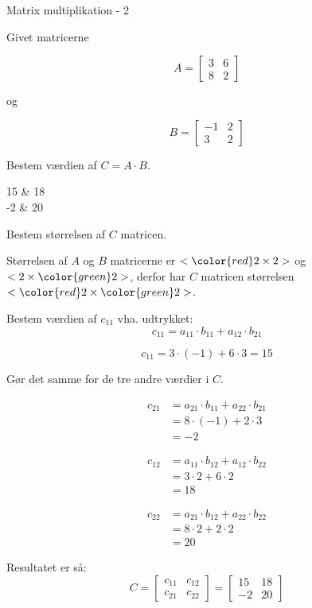 \documentclass{article}
\begin{document}
\newpage

\begin{exercise}{Matrix multiplikation - 2}
	
	Givet matricerne 
	
	\[
	A = \left[\begin{array}{rr}
	3 & 6 \\ 
	8 & 2 
	\end{array} \right]
	\]
	
	og 
	
	\[
	B = \left[\begin{array}{rr}
	-1 & 2 \\ 
	3 & 2 
	\end{array} \right]
	\]
	
	Bestem værdien af $C = A \cdot B$.
	
	\begin{answermatrix}
		15 & 18  \\
		-2 & 20 
	\end{answermatrix}
	
	\hint
	Bestem størrelsen af $C$ matricen.
	
	\hint
	Størrelsen af $A$ og $B$ matricerne er $<{\color{red} 2} \times 2>$ og $<2 \times {\color{green}2}>$, 
	derfor har $C$ matricen størrelsen $<{\color{red} 2} \times {\color{green}2}>$.
	
	\hint
	Bestem værdien af $c_{11}$ vha. udtrykket:
	\[
	c_{11} = a_{11} \cdot b_{11} + a_{12} \cdot b_{21}
	\]
	
	\hint
	\[
	c_{11} = 3 \cdot (-1) + 6 \cdot 3 = 15
	\]
	
	\hint
	Gør det samme for de tre andre værdier i $C$.
	
	\hint
	\begin{align*}
		c_{21} & = a_{21} \cdot b_{11} + a_{22} \cdot b_{21} \\
		& = 8 \cdot (-1) + 2 \cdot 3 \\
		& = -2
	\end{align*}
	
	\hint
	\begin{align*}
		c_{12} & = a_{11} \cdot b_{12} + a_{12} \cdot b_{22} \\
		& = 3 \cdot 2 + 6 \cdot 2 \\
		& = 18
	\end{align*}
	
	\hint
	\begin{align*}
		c_{22} & = a_{21} \cdot b_{12} + a_{22} \cdot b_{22} \\
		& = 8 \cdot 2 + 2 \cdot 2 \\
		& = 20
	\end{align*}
	
	
	\hint
	Resultatet er så:
	\[
	C = \left[\begin{array}{rr}
	c_{11} & c_{12} \\
	c_{21} & c_{22} 
	\end{array} \right] = 
	\left[\begin{array}{rr}
	15 & 18 \\
	-2 & 20 
	\end{array} \right]
	\]
	
	
\end{exercise}
\end{document}
